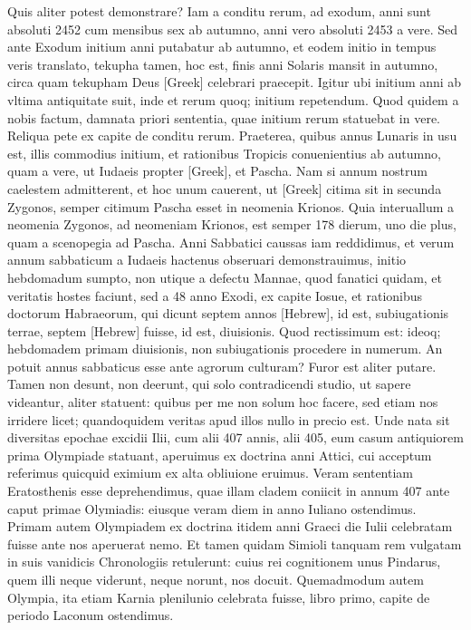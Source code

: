 Quis aliter potest demonstrare?
Iam a conditu rerum, ad exodum,
anni sunt absoluti 2452 cum mensibus sex ab autumno, anni vero
absoluti 2453 a vere.
Sed ante Exodum initium anni putabatur ab
autumno, et eodem initio in tempus veris translato, tekupha tamen,
hoc est, finis anni Solaris mansit in autumno, circa quam tekupham
Deus \textgreek{[Greek]} celebrari praecepit.
Igitur ubi initium anni
ab vltima antiquitate suit, inde et rerum quoq; initium repetendum.
Quod quidem a nobis factum, damnata priori sententia, quae
initium rerum statuebat in vere.
Reliqua pete ex capite de conditu
rerum.
Praeterea, quibus annus Lunaris in usu est, illis commodius
initium, et rationibus Tropicis conuenientius ab autumno, quam
a vere, ut Iudaeis propter \textgreek{[Greek]}, et Pascha.
Nam si annum
nostrum caelestem admitterent, et hoc unum cauerent, ut \textgreek{[Greek]}
citima sit in secunda Zygonos, semper citimum Pascha esset in neomenia
Krionos.
Quia interuallum a neomenia Zygonos, ad neomeniam
Krionos, est semper 178 dierum, uno die plus, quam a scenopegia
ad Pascha.
Anni Sabbatici caussas iam reddidimus, et verum
annum sabbaticum a Iudaeis hactenus obseruari demonstrauimus,
initio hebdomadum sumpto, non utique a defectu Mannae,
quod fanatici quidam, et veritatis hostes faciunt, sed a 48 anno Exodi,
ex capite  Iosue, et rationibus doctorum Habraeorum, qui
dicunt septem annos \texthebrew{[Hebrew]}, id est, subiugationis terrae,
septem \texthebrew{[Hebrew]}
fuisse, id est, diuisionis.
Quod rectissimum est: ideoq; hebdomadem
primam diuisionis, non subiugationis procedere in numerum.
An
potuit annus sabbaticus esse ante agrorum culturam?
Furor est aliter putare.
Tamen non desunt, non deerunt, qui solo contradicendi
studio, ut sapere videantur, aliter statuent: quibus per me non solum
hoc facere, sed etiam nos irridere licet; quandoquidem veritas apud
illos nullo in precio est.
Unde nata sit diversitas epochae excidii Ilii,
cum alii 407 annis, alii 405, eum casum antiquiorem prima Olympiade
statuant, aperuimus ex doctrina anni Attici, cui acceptum
referimus quicquid eximium ex alta obliuione eruimus.
Veram sententiam
Eratosthenis esse deprehendimus, quae illam cladem coniicit
in annum 407 ante caput primae Olymiadis: eiusque veram
diem in anno Iuliano ostendimus.
Primam autem Olympiadem
ex doctrina itidem anni Graeci  die Iulii celebratam fuisse ante
nos aperuerat nemo.
Et tamen quidam Simioli tanquam rem
vulgatam in suis vanidicis Chronologiis retulerunt: cuius rei cognitionem
unus Pindarus, quem illi neque viderunt, neque norunt, nos
docuit.
Quemadmodum autem Olympia, ita etiam Karnia plenilunio
celebrata fuisse, libro primo, capite de periodo Laconum
ostendimus.

